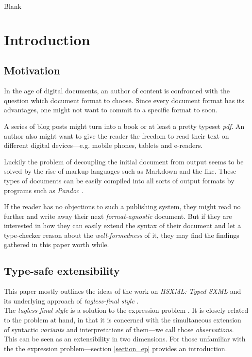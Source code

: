 \clearpage
Blank
\clearpage

\section{Introduction}

\subsection{Motivation}

In the age of digital documents, an author of content is confronted with the
question which document format to choose. Since every document format has its
advantages, one might not want to commit to a specific format to soon.

A series of blog posts might turn into a book or at least a pretty typeset
\emph{pdf}. An author also might want to give the reader the freedom to read
their text on different digital devices—e.g. mobile phones, tablets and
e-readers.

Luckily the problem of decoupling the initial document from output seems to be
solved by the rise of markup languages such as Markdown and the like. These
types of documents can be easily compiled into all sorts of output formats by
programs such as \emph{Pandoc} \cite{pandoc}.

If the reader has no objections to such a publishing system, they might read no
further and write away their next \emph{format-agnostic} document. But if they
are interested in how they can easily extend the syntax of their document and
let a type-checker reason about the \emph{well-formedness} of it, they may find
the findings gathered in this paper worth while.

\subsection{Type-safe extensibility}

This paper mostly outlines the ideas of the work on \emph{HSXML: Typed SXML}
\cite{hsxml} and its underlying approach of \emph{tagless-final style}
\cite{finally-tagless, finally-tagless-tut}.\\
The \emph{tagless-final style} is a solution to the expression problem
\cite{expression-problem}. It is closely related to the problem at hand, in that
it is concerned with the simultaneous extension of syntactic \emph{variants} and
interpretations of them—we call those \emph{observations}. This can be seen as
an extensibility in two dimensions. For those unfamiliar with the the expression
problem—section \ref{section_ep} provides an introduction.

